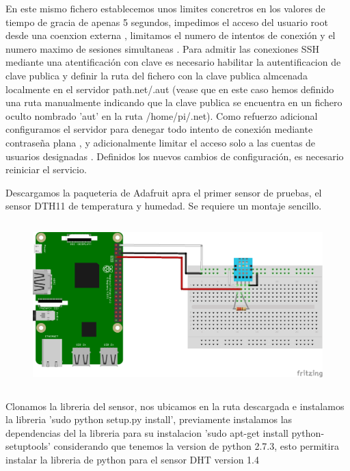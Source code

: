 En este mismo fichero establecemos unos limites concretros en los valores de tiempo de gracia  de apenas 5 segundos, impedimos el acceso del usuario root desde una coenxion externa , limitamos el numero de intentos de conexión  y el numero maximo de sesiones simultaneas . Para admitir las conexiones SSH mediante una atentificación con clave es necesario habilitar la autentificacion de clave publica  y definir la ruta del fichero con la clave publica almcenada localmente en el servidor  path{.net/.aut} (vease que en este caso hemos definido una ruta manualmente indicando que la clave publica se encuentra en un fichero oculto nombrado 'aut' en la ruta /home/pi/.net). Como refuerzo adicional configuramos el servidor para denegar todo intento de conexión mediante contraseña plana , y adicionalmente limitar el acceso solo a las cuentas de usuarios designadas . Definidos los nuevos cambios de configuración, es necesario reiniciar el servicio.

Descargamos la paqueteria de Adafruit apra el primer sensor de pruebas, el sensor DTH11 de temperatura y humedad.
Se requiere un montaje sencillo.
\begin{figure}[hbt!]
\centering
\includegraphics[height=2.5in]{figures/nodo_1.png}
\end{figure}

Clonamos la libreria del sensor, nos ubicamos en la ruta descargada  e instalamos la libreria 'sudo python setup.py install', previamente instalamos las dependencias del la libreria para su instalacion 'sudo apt-get install python-setuptools' considerando que tenemos la version de python 2.7.3, esto permitira instalar la libreria de python para el sensor DHT version 1.4
